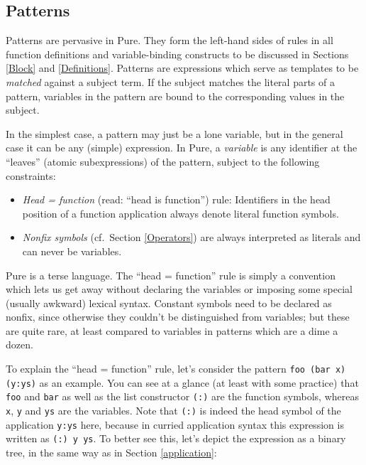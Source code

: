 \documentclass[a4paper,12pt]{article}
\begin{document}
\subsection{Patterns}
\label{Patterns}

Patterns are pervasive in Pure. They form the left-hand sides of rules in all function definitions and variable-binding constructs to be discussed in Sections \ref{Block} and \ref{Definitions}. Patterns are expressions which serve as templates to be \emph{matched} against a subject term. If the subject matches the literal parts of a pattern, variables in the pattern are bound to the corresponding values in the subject.

In the simplest case, a pattern may just be a lone variable, but in the general case it can be any (simple) expression. In Pure, a \emph{variable} is any identifier at the ``leaves'' (atomic subexpressions) of the pattern, subject to the following constraints:

\begin{itemize}
\item \emph{Head = function} (read: ``head is function'') rule: Identifiers in the head position of a function application always denote literal function symbols.
\item \emph{Nonfix symbols} (cf.\ Section \ref{Operators}) are always interpreted as literals and can never be variables.
\end{itemize}

Pure is a terse language. The ``head = function'' rule is simply a convention which lets us get away without declaring the variables or imposing some special (usually awkward) lexical syntax. Constant symbols need to be declared as nonfix, since otherwise they couldn't be distinguished from variables; but these are quite rare, at least compared to variables in patterns which are a dime a dozen.

To explain the ``head = function'' rule, let's consider the pattern \lstinline{foo (bar x) (y:ys)} as an example. You can see at a glance (at least with some practice) that \verb|foo| and \verb|bar| as well as the list constructor \verb|(:)| are the function symbols, whereas \verb|x|, \verb|y| and \verb|ys| are the variables. Note that \texttt{(:)} is indeed the head symbol of the application \texttt{y:ys} here, because in curried application syntax this expression is written as \texttt{(:)\ y ys}. To better see this, let's depict the expression as a binary tree, in the same way as in Section \ref{application}:
\end{document}
